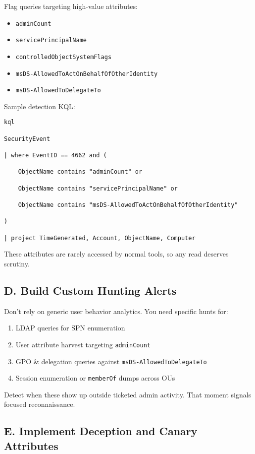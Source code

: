 {{Flag queries targeting high-value attributes:

\begin{itemize}
    \item \texttt{adminCount}
    \item \texttt{servicePrincipalName}
    \item \texttt{controlledObjectSystemFlags}
    \item \texttt{msDS-AllowedToActOnBehalfOfOtherIdentity}
    \item \texttt{msDS-AllowedToDelegateTo}
\end{itemize}

Sample detection KQL:
\begin{verbatim}
kql

SecurityEvent

| where EventID == 4662 and (

    ObjectName contains "adminCount" or 

    ObjectName contains "servicePrincipalName" or 

    ObjectName contains "msDS-AllowedToActOnBehalfOfOtherIdentity"

)

| project TimeGenerated, Account, ObjectName, Computer
\end{verbatim}

These attributes are rarely accessed by normal tools, so any read deserves scrutiny.

\subsection{D. Build Custom Hunting Alerts}

Don’t rely on generic user behavior analytics. You need specific hunts for:

\begin{enumerate}
    \item LDAP queries for SPN enumeration
    \item User attribute harvest targeting \texttt{adminCount}
    \item GPO \& delegation queries against \texttt{msDS-AllowedToDelegateTo}
    \item Session enumeration or \texttt{memberOf} dumps across OUs
\end{enumerate}

Detect when these show up outside ticketed admin activity. That moment signals focused reconnaissance.

\subsection{E. Implement Deception and Canary Attributes}

}}
